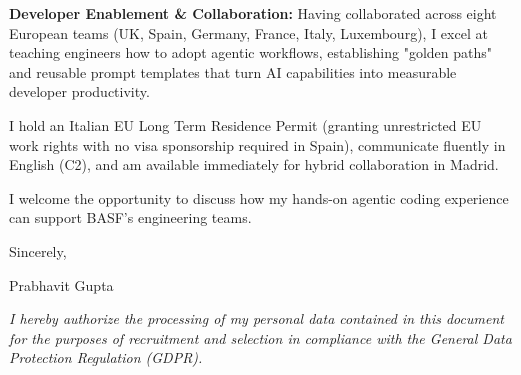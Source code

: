 \documentclass[10.5pt,a4paper]{article}
\begin{document}
\textbf{Developer Enablement \& Collaboration:} Having collaborated across eight European teams (UK, Spain, Germany, France, Italy, Luxembourg), I excel at teaching engineers how to adopt agentic workflows, establishing "golden paths" and reusable prompt templates that turn AI capabilities into measurable developer productivity.

I hold an Italian EU Long Term Residence Permit (granting unrestricted EU work rights with no visa sponsorship required in Spain), communicate fluently in English (C2), and am available immediately for hybrid collaboration in Madrid.

I welcome the opportunity to discuss how my hands-on agentic coding experience can support BASF's engineering teams.

Sincerely,

Prabhavit Gupta

\vspace{0.6em}
{\footnotesize \textit{I hereby authorize the processing of my personal data contained in this document for the purposes of recruitment and selection in compliance with the General Data Protection Regulation (GDPR).}\par}
\end{document}
